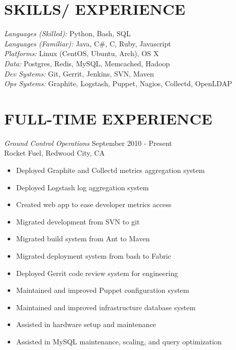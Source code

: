 \documentclass[line,margin]{res}
\begin{document}
\address{Sunnyvale, CA 94087}
\address{\sl tabletcorry@gmail.com}

\begin{resume}
 
\section{SKILLS/ EXPERIENCE} {\sl Languages (Skilled):} Python, Bash, SQL\\
                {\sl Languages (Familiar):} Java, C\#, C, Ruby, Javascript\\
                {\sl Platforms:} Linux (CentOS, Ubuntu, Arch), OS X\\
                {\sl Data:} Postgres, Redis, MySQL, Memcached, Hadoop\\
                {\sl Dev Systems:} Git, Gerrit, Jenkins, SVN, Maven\\
                {\sl Ops Systems:} Graphite, Logstash, Puppet, Nagios, Collectd, OpenLDAP
 
\section{FULL-TIME EXPERIENCE} 
                {\sl Ground Control Operations} \hfill September 2010 - Present \\
                Rocket Fuel, Redwood City, CA
                \begin{itemize}  \itemsep -2pt
                 \item Deployed Graphite and Collectd metrics aggregation system
                 \item Deployed Logstash log aggregation system
                 \item Created web app to ease developer metrics access
                 \item Migrated development from SVN to git
                 \item Migrated build system from Ant to Maven
                 \item Migrated deployment system from bash to Fabric
                 \item Deployed Gerrit code review system for engineering
                 \item Maintained and improved Puppet configuration system
                 \item Maintained and improved infrastructure database system
                 \item Assisted in hardware setup and maintenance
                 \item Assisted in MySQL maintenance, scaling, and query optimization
                \end{itemize}


\end{resume}
\end{document}
